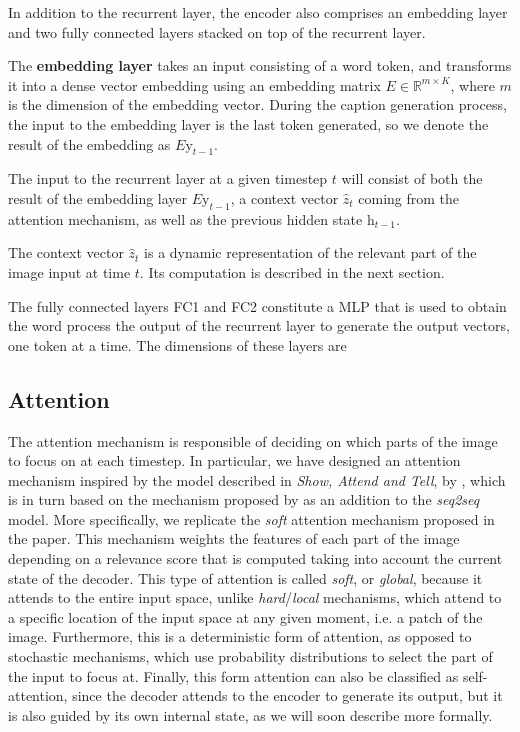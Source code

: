 In addition to the recurrent layer, the encoder also comprises an embedding layer and two fully connected layers stacked on top of the recurrent layer. 

The \textbf{embedding layer} takes an input consisting of a word token, and transforms it into a dense vector embedding using an embedding matrix $E \in \mathbb{R}^{m \times K}$, where $m$ is the dimension of the embedding vector. During the caption generation process, the input to the embedding layer is the last token generated, so we denote the result of the embedding as $E\text{y}_{t-1}$.

The input to the recurrent layer at a given timestep $t$ will consist of both the result of the embedding layer $E\text{y}_{t-1}$, a context vector $\hat{z}_t$ coming from the attention mechanism, as well as the previous hidden state $\text{h}_{t-1}$. 

The context vector $\hat{z}_t$ is a dynamic representation of the relevant part of the image input at time $t$. Its computation is described in the next section.

The fully connected layers FC1 and FC2 constitute a MLP that is used to obtain the word  process the output of the recurrent layer to generate the output vectors, one token at a time. The dimensions of these layers are 

\subsection{Attention}

The attention mechanism is responsible of deciding on which parts of the image to focus on at each timestep. In particular, we have designed an attention mechanism inspired by the model described in \textit{Show, Attend and Tell}, by \citet{Xu2015}, which is in turn based on the mechanism proposed by \citet{Bahdanau2015} as an addition to the \textit{seq2seq} model. More specifically, we replicate the  \textit{soft} attention mechanism proposed in the paper. This mechanism weights the features of each part of the image depending on a relevance score that is computed taking into account the current state of the decoder. This type of attention is called \textit{soft}, or \textit{global}, because it attends to the entire input space, unlike \textit{hard}/\textit{local} mechanisms, which attend to a specific location of the input space at any given moment, i.e. a patch of the image. Furthermore, this is a deterministic form of attention, as opposed to stochastic mechanisms, which use probability distributions to select the part of the input to focus at. Finally, this form attention can also be classified as self-attention, since the decoder attends to the encoder to generate its output, but it is also guided by its own internal state, as we will soon describe more formally.

